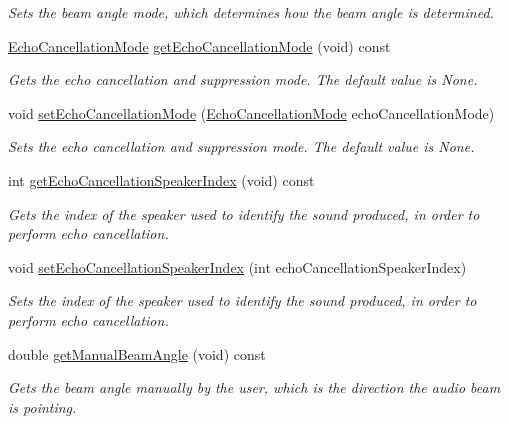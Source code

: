 \begin{DoxyCompactItemize}
\begin{DoxyCompactList}\small\item\em \-Sets the beam angle mode, which determines how the beam angle is determined. \end{DoxyCompactList}\item 
\hyperlink{echo_cancellation_mode_8h_a715b89d37036b5f4d00951e121703554}{\-Echo\-Cancellation\-Mode} \hyperlink{class_kinect_audio_source_a8a62c138edee1acd05e84123d1ede746}{get\-Echo\-Cancellation\-Mode} (void) const 
\begin{DoxyCompactList}\small\item\em \-Gets the echo cancellation and suppression mode. \-The default value is \-None. \end{DoxyCompactList}\item 
void \hyperlink{class_kinect_audio_source_a1d720d1e28bd29b00f707f215cbad1c0}{set\-Echo\-Cancellation\-Mode} (\hyperlink{echo_cancellation_mode_8h_a715b89d37036b5f4d00951e121703554}{\-Echo\-Cancellation\-Mode} echo\-Cancellation\-Mode)
\begin{DoxyCompactList}\small\item\em \-Sets the echo cancellation and suppression mode. \-The default value is \-None. \end{DoxyCompactList}\item 
int \hyperlink{class_kinect_audio_source_a720429b571964476e044f464b2701612}{get\-Echo\-Cancellation\-Speaker\-Index} (void) const 
\begin{DoxyCompactList}\small\item\em \-Gets the index of the speaker used to identify the sound produced, in order to perform echo cancellation. \end{DoxyCompactList}\item 
void \hyperlink{class_kinect_audio_source_ab5f2ecab73f0a5f5cb52963b38a0e303}{set\-Echo\-Cancellation\-Speaker\-Index} (int echo\-Cancellation\-Speaker\-Index)
\begin{DoxyCompactList}\small\item\em \-Sets the index of the speaker used to identify the sound produced, in order to perform echo cancellation. \end{DoxyCompactList}\item 
double \hyperlink{class_kinect_audio_source_abd52a6678d22ffad1da638072ad7df17}{get\-Manual\-Beam\-Angle} (void) const 
\begin{DoxyCompactList}\small\item\em \-Gets the beam angle manually by the user, which is the direction the audio beam is pointing. \end{DoxyCompactList}\item 

\end{DoxyCompactItemize}
